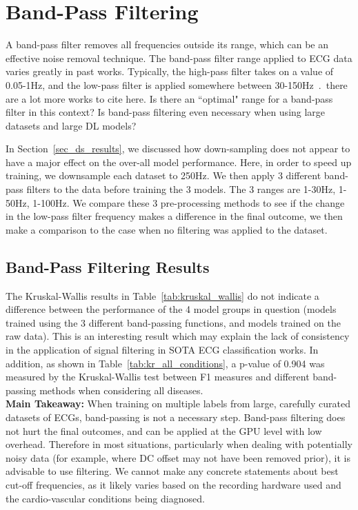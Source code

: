 \documentclass[pmlr,twocolumn]{jmlr}%
\begin{document}
\section{Band-Pass Filtering}
\label{sec:BandPass}
A band-pass filter removes all frequencies outside its range, which can be an effective noise removal technique. The band-pass filter range applied to ECG data varies greatly in past works. Typically, the high-pass filter takes on a value of 0.05-1Hz, and the low-pass filter is applied somewhere between 30-150Hz~\cite{uwaechia2021comprehensive,luo2010review}.~{\color{red}there are a lot more works to cite here}. Is there an ``optimal" range for a band-pass filter in this context? Is band-pass filtering even necessary when using large datasets and large DL models?

In Section~\ref{sec_ds_results}, we discussed how down-sampling does not appear to have a major effect on the over-all model performance. Here, in order to speed up training, we downsample each dataset to 250Hz. We then apply 3 different band-pass filters to the data before training the 3 models. The 3 ranges are 1-30Hz, 1-50Hz, 1-100Hz. We compare these 3 pre-processing methods to see if the change in the low-pass filter frequency makes a difference in the final outcome, we then make a comparison to the case when no filtering was applied to the dataset. 

\subsection{Band-Pass Filtering Results}
The Kruskal-Wallis results in Table~\ref{tab:kruskal_wallis} do not indicate a difference between the performance of the 4 model groups in question (models trained using the 3 different band-passing functions, and models trained on the raw data). This is an interesting result which may explain the lack of consistency in the application of signal filtering in SOTA ECG classification works. In addition, as shown in Table~\ref{tab:kr_all_conditions}, a p-value of 0.904 was measured by the Kruskal-Wallis test between F1 measures and different band-passing methods when considering all diseases. 
\\
\textbf{Main Takeaway:} When training on multiple labels from large, carefully curated datasets of ECGs, band-passing is not a necessary step. Band-pass filtering does not hurt the final outcomes, and can be applied at the GPU level with low overhead. Therefore in most situations, particularly when dealing with potentially noisy data (for example, where DC offset may not have been removed prior), it is advisable to use filtering. We cannot make any concrete statements about best cut-off frequencies, as it likely varies based on the recording hardware used and the cardio-vascular conditions being diagnosed. 
\end{document}
